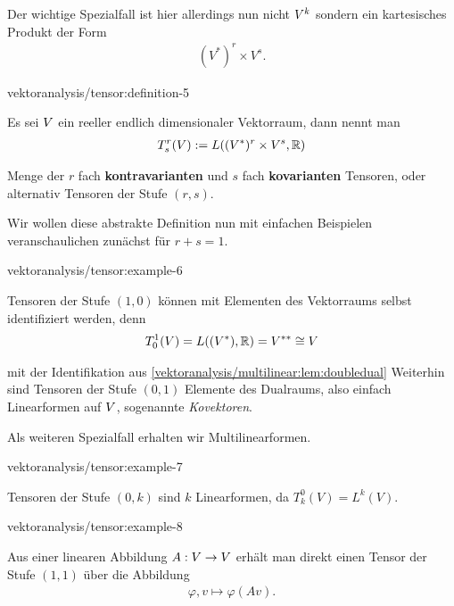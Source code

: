 \par
Der wichtige Spezialfall ist hier allerdings nun nicht \(V^k\) sondern ein kartesisches Produkt der Form
\begin{align*}
(V^\ast)^r\times V^s.
\end{align*}\begin{definition}{}{vektoranalysis/tensor:definition-5}



\par
Es sei \(V\) ein reeller endlich dimensionaler Vektorraum, dann nennt man
\begin{align*}
T^r_s(V) := L((V^\ast)^r\times V^s, \mathbb{R})
\end{align*}
\par
Menge der \(r\) fach \textbf{kontravarianten} und \(s\) fach \textbf{kovarianten} Tensoren, oder alternativ Tensoren der Stufe \((r,s)\).
\end{definition}

\par
Wir wollen diese abstrakte Definition nun mit einfachen Beispielen veranschaulichen zunächst für \(r+s=1\).
\begin{example}{}{vektoranalysis/tensor:example-6}



\par
Tensoren der Stufe \((1,0)\) können mit Elementen des Vektorraums selbst identifiziert werden, denn
\begin{align*}
T^1_0(V) = L((V^\ast), \mathbb{R}) = V^{\ast\ast}\cong V
\end{align*}
\par
mit der Identifikation aus \cref{vektoranalysis/multilinear:lem:doubledual}  Weiterhin sind Tensoren der Stufe \((0,1)\) Elemente des
Dualraums, also einfach Linearformen auf \(V\), sogenannte \emph{Kovektoren}.
\end{example}

\par
Als weiteren Spezialfall erhalten wir Multilinearformen.
\begin{example}{}{vektoranalysis/tensor:example-7}



\par
Tensoren der Stufe \((0,k)\) sind \(k\) Linearformen, da \(T^0_k(V) = L^k(V)\).
\end{example}
\begin{example}{}{vektoranalysis/tensor:example-8}



\par
Aus einer linearen Abbildung \(A:V\to V\) erhält man direkt einen Tensor der Stufe \((1,1)\) über die Abbildung
\begin{align*}
\varphi, v \mapsto \varphi(Av).
\end{align*}\end{example}


